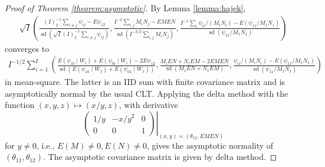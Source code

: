 \documentclass[12pt]{article}
\DeclareMathOperator{\AUC}{AUC}
\DeclareMathOperator{\sd}{sd}
\newcommand{\I}{I}
\newcommand{\E}{E}
\newcommand{\cind}{\perp \!\!\! \perp}
\newcommand{\aucindiv}{\theta_{11}}%
\newcommand{\aucpop}{\theta_{12}}%
\newcommand{\Kernel}{\psi}
\newcommand{\W}[1]{W_{#1}}
\newcommand{\comment}[1]{
  \iftoggle{commenttoggle}{
    {\normalsize{\color{red}{ #1}}\normalsize}
  }
  {}
}
\begin{document}
  \begin{proof}[Proof of Theorem \ref{theorem:asymptotic}]

    By Lemma \ref{lemma:hajek},%
  \begin{align}
    \sqrt{\I}\left(
    \frac{(\I)_2^{-1}\sum_{i\neq j}\Kernel_{ij}-\E\Kernel_{12}}{\sd(\sqrt{\I}(\I)_2^{-1}\sum_{i\neq j}\Kernel_{ij})}
    ,        
    \frac{\I^{-2}\sum_{i,j}M_iN_j - \E M\E N}
    {\sd(\I^{-3/2}\sum_{i, j}M_iN_j ) }
    ,
     \frac{\I^{-1}\sum_i \Kernel_{ii}/(M_iN_i) - \E(\Kernel_{11}/M_1N_1)}
     {\sd(\Kernel_{11}/M_1N_1)}
    \right)
  \end{align}
  converges to
  \begin{align}
    \I^{-1/2}\sum_{i=1}^\I\left(
     \frac{\E(\Kernel_{i0}\mid\W{i})+\E(\Kernel_{0i}\mid\W{i})-2\E\Kernel_{12}}
    {\sd(\E(\Kernel_{10}\mid\W{1})+\E(\Kernel_{01}\mid\W{1}))}
    ,
     \frac{M_i\E N + N_i\E M - 2\E M\E N}
     {\sd(M_1\E N + N_1\E M)} 
     ,
     \frac{ \Kernel_{ii}/(M_iN_i) - \E(\Kernel_{11}/M_1N_1)}
    {\sd(\Kernel_{11}/M_1N_1)}
    \right)
  \end{align}
  in mean-square. The latter is an IID sum with finite covariance matrix and is asymptotically normal by the usual CLT.
  Applying the delta method with the function
  $(x,y,z)\mapsto (x/y,z)$, with derivative
  $$
\left.  \begin{pmatrix}
    1/y & -x/y^2 & 0 \\
    0 & 0 & 1
  \end{pmatrix} \right|_{(x,y)=(\aucpop,\E M \E N)}
  $$
  for $y\neq 0$, i.e., $E(M)\neq 0, E(N)\neq 0$, gives the asymptotic normality of $(\aucindiv,\aucpop)$.
  The asymptotic covariance matrix is given by delta method. %


  

  



\end{proof}
\end{document}
